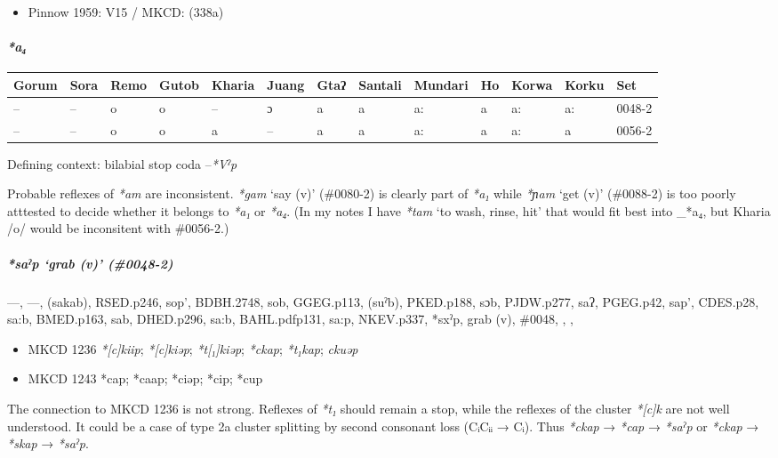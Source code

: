 \documentclass[a4paper,]{article}
\providecommand{\tightlist}{%
  \setlength{\itemsep}{0pt}\setlength{\parskip}{0pt}}
\let\oldparagraph\paragraph
\renewcommand{\paragraph}[1]{\oldparagraph{#1}\mbox{}}
\let\oldsubparagraph\subparagraph
\renewcommand{\subparagraph}[1]{\oldsubparagraph{#1}\mbox{}}
\begin{document}
\begin{itemize}
\tightlist
\item
  Pinnow 1959: V15 / MKCD: (338a)
\end{itemize}

\paragraph{\texorpdfstring{\emph{*a₄}}{*a₄}}\label{a-3}

\begin{longtable}[]{@{}lllllllllllll@{}}
\toprule
Gorum & Sora & Remo & Gutob & Kharia & Juang & Gtaʔ & Santali & Mundari
& Ho & Korwa & Korku & Set\tabularnewline
\midrule
\endhead
-- & -- & o & o & -- & ɔ & a & a & a: & a & a: & a: &
0048-2\tabularnewline
-- & -- & o & o & a & -- & a & a & a: & a & a: & a &
0056-2\tabularnewline
\bottomrule
\end{longtable}

Defining context: bilabial stop coda --\emph{*Vˀp}

Probable reflexes of \emph{*am} are inconsistent. \emph{*gam} `say (v)'
(\#0080-2) is clearly part of \emph{*a₁} while \emph{*ɲam} `get (v)'
(\#0088-2) is too poorly atttested to decide whether it belongs to
\emph{*a₁} or \emph{*a₄}. (In my notes I have \emph{*tam} `to wash,
rinse, hit' that would fit best into \_*a₄, but Kharia /o/ would be
inconsitent with \#0056-2.)

\subparagraph{\texorpdfstring{\emph{*saˀp} `grab (v)'
(\#0048-2)}{*saˀp grab (v) (\#0048-2)}}\label{saux2c0p-grab-v-0048-2}

---, ---, (sakab), RSED.p246, sop', BDBH.2748, sob, GGEG.p113, (suˀb),
PKED.p188, sɔb, PJDW.p277, saʔ, PGEG.p42, sap', CDES.p28, sa:b,
BMED.p163, sab, DHED.p296, sa:b, BAHL.pdfp131, sa:p, NKEV.p337, *sxˀp,
grab (v), \#0048, , ,

\begin{itemize}
\tightlist
\item
  MKCD 1236 \emph{*{[}c{]}kiip}; \emph{*{[}c{]}kiəp};
  \emph{*t{[}₁{]}kiəp}; \emph{*ckap}; \emph{*t₁kap}; \emph{ckuəp}
\item
  MKCD 1243 *cap; *caap; *ciəp; *cip; *cup
\end{itemize}

The connection to MKCD 1236 is not strong. Reflexes of \emph{*t₁} should
remain a stop, while the reflexes of the cluster \emph{*{[}c{]}k} are
not well understood. It could be a case of type 2a cluster splitting by
second consonant loss (CᵢCᵢᵢ → Cᵢ). Thus \emph{*ckap} → \emph{*cap} →
\emph{*saˀp} or \emph{*ckap} → \emph{*skap} → \emph{*saˀp}.
\end{document}
